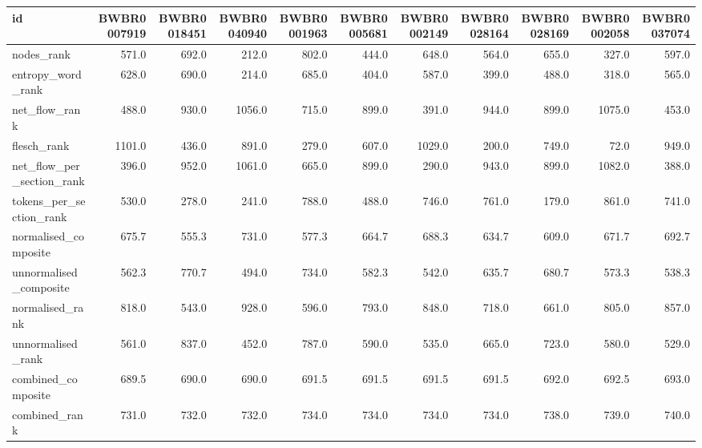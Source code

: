 \begin{tabular}{lrrrrrrrrrr}
\toprule
id & BWBR0007919 & BWBR0018451 & BWBR0040940 & BWBR0001963 & BWBR0005681 & BWBR0002149 & BWBR0028164 & BWBR0028169 & BWBR0002058 & BWBR0037074 \\
\midrule
nodes\_rank & 571.0 & 692.0 & 212.0 & 802.0 & 444.0 & 648.0 & 564.0 & 655.0 & 327.0 & 597.0 \\
\cline{1-11}
entropy\_word\_rank & 628.0 & 690.0 & 214.0 & 685.0 & 404.0 & 587.0 & 399.0 & 488.0 & 318.0 & 565.0 \\
\cline{1-11}
net\_flow\_rank & 488.0 & 930.0 & 1056.0 & 715.0 & 899.0 & 391.0 & 944.0 & 899.0 & 1075.0 & 453.0 \\
\cline{1-11}
flesch\_rank & 1101.0 & 436.0 & 891.0 & 279.0 & 607.0 & 1029.0 & 200.0 & 749.0 & 72.0 & 949.0 \\
\cline{1-11}
net\_flow\_per\_section\_rank & 396.0 & 952.0 & 1061.0 & 665.0 & 899.0 & 290.0 & 943.0 & 899.0 & 1082.0 & 388.0 \\
\cline{1-11}
tokens\_per\_section\_rank & 530.0 & 278.0 & 241.0 & 788.0 & 488.0 & 746.0 & 761.0 & 179.0 & 861.0 & 741.0 \\
\cline{1-11}
normalised\_composite & 675.7 & 555.3 & 731.0 & 577.3 & 664.7 & 688.3 & 634.7 & 609.0 & 671.7 & 692.7 \\
\cline{1-11}
unnormalised\_composite & 562.3 & 770.7 & 494.0 & 734.0 & 582.3 & 542.0 & 635.7 & 680.7 & 573.3 & 538.3 \\
\cline{1-11}
normalised\_rank & 818.0 & 543.0 & 928.0 & 596.0 & 793.0 & 848.0 & 718.0 & 661.0 & 805.0 & 857.0 \\
\cline{1-11}
unnormalised\_rank & 561.0 & 837.0 & 452.0 & 787.0 & 590.0 & 535.0 & 665.0 & 723.0 & 580.0 & 529.0 \\
\cline{1-11}
combined\_composite & 689.5 & 690.0 & 690.0 & 691.5 & 691.5 & 691.5 & 691.5 & 692.0 & 692.5 & 693.0 \\
\cline{1-11}
combined\_rank & 731.0 & 732.0 & 732.0 & 734.0 & 734.0 & 734.0 & 734.0 & 738.0 & 739.0 & 740.0 \\
\cline{1-11}
\bottomrule
\end{tabular}
